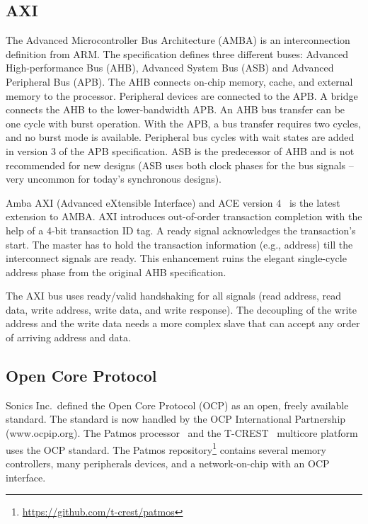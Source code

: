 \documentclass[%
    10pt,
    headinclude, footexclude,
    openright, %
    notitlepage,
    cleardoubleempty,
    headsepline,
    pointlessnumbers,
    bibtotoc, idxtotoc,
    ]{scrbook}
\newcommand{\todo}[1]{{\emph{TODO: #1}}}
\renewcommand{\todo}[1]{}
\begin{document}
\todo{Sample code for a peripheral, how to test?}

\subsection{AXI}

The Advanced Microcontroller Bus Architecture (AMBA) \cite{soc:amba}
is an interconnection definition from ARM. The specification
defines three different buses: Advanced High-performance Bus (AHB),
Advanced System Bus (ASB) and Advanced Peripheral Bus (APB). The
AHB connects on-chip memory, cache, and external memory to
the processor. Peripheral devices are connected to the APB. A bridge
connects the AHB to the lower-bandwidth APB. An AHB bus transfer can
be one cycle with burst operation. With the APB, a bus transfer
requires two cycles, and no burst mode is available. Peripheral bus
cycles with wait states are added in version 3 of the APB
specification. ASB is the predecessor of AHB and is not recommended
for new designs (ASB uses both clock phases for the bus signals --
very uncommon for today's synchronous designs).

Amba AXI (Advanced eXtensible Interface) and ACE
version 4~\cite{axi4standard}  is the latest
extension to AMBA. AXI introduces out-of-order transaction
completion with the help of a 4-bit transaction ID tag. A ready
signal acknowledges the transaction's start. The master has to hold
the transaction information (e.g., address) till the interconnect
signals are ready. This enhancement ruins the elegant single-cycle
address phase from the original AHB specification.

The AXI bus uses ready/valid handshaking for all signals (read address,
read data, write address, write data, and write response).
The decoupling of the write address and the write data needs a more complex
slave that can accept any order of arriving address and data.


\todo{Sample code for a servant, how to test? Probably with Xilinx stuff and maybe
code from the zipcpu.}

\subsection{Open Core Protocol}

Sonics Inc.\ defined the Open Core Protocol (OCP) \cite{soc:ocp} as
an open, freely available standard. The standard is now handled by
the OCP International Partnership (www.ocpip.org).
The Patmos processor~\cite{patmos:rts2018} and the
T-CREST~\cite{t-crest:2015} multicore platform uses the OCP
standard. The Patmos repository\footnote{\url{https://github.com/t-crest/patmos}}
contains several memory controllers, many peripherals devices,
and a network-on-chip with an OCP interface.
\end{document}
